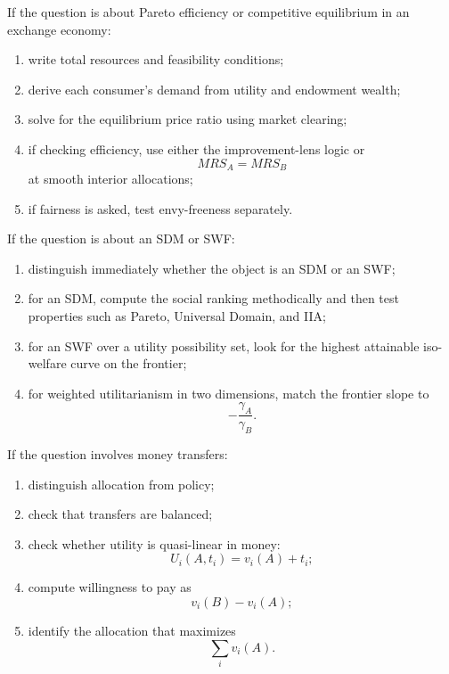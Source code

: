 \begin{examtip}[title={Method Pattern: Exchange-economy questions}]
If the question is about Pareto efficiency or competitive equilibrium in an exchange economy:
\begin{enumerate}
    \item write total resources and feasibility conditions;
    \item derive each consumer's demand from utility and endowment wealth;
    \item solve for the equilibrium price ratio using market clearing;
    \item if checking efficiency, use either the improvement-lens logic or
    \[
    MRS_A=MRS_B
    \]
    at smooth interior allocations;
    \item if fairness is asked, test envy-freeness separately.
\end{enumerate}
\end{examtip}

\begin{examtip}[title={Method Pattern: Social-choice questions}]
If the question is about an SDM or SWF:
\begin{enumerate}
    \item distinguish immediately whether the object is an SDM or an SWF;
    \item for an SDM, compute the social ranking methodically and then test properties such as Pareto, Universal Domain, and IIA;
    \item for an SWF over a utility possibility set, look for the highest attainable iso-welfare curve on the frontier;
    \item for weighted utilitarianism in two dimensions, match the frontier slope to
    \[
    -\frac{\gamma_A}{\gamma_B}.
    \]
\end{enumerate}
\end{examtip}

\begin{examtip}[title={Method Pattern: Lecture 11 utilitarianism questions}]
If the question involves money transfers:
\begin{enumerate}
    \item distinguish allocation from policy;
    \item check that transfers are balanced;
    \item check whether utility is quasi-linear in money:
    \[
    U_i(A,t_i)=v_i(A)+t_i;
    \]
    \item compute willingness to pay as
    \[
    v_i(B)-v_i(A);
    \]
    \item identify the allocation that maximizes
    \[
    \sum_i v_i(A).
    \]
\end{enumerate}
\end{examtip}

